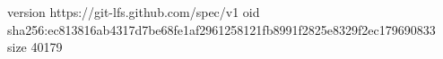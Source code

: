 version https://git-lfs.github.com/spec/v1
oid sha256:ec813816ab4317d7be68fe1af2961258121fb8991f2825e8329f2ec179690833
size 40179
